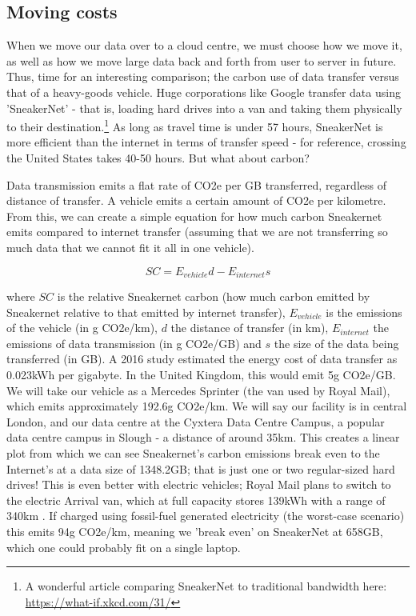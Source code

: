 \documentclass{article}
\begin{document}
\subsection{Moving costs}
When we move our data over to a cloud centre, we must choose how we move it, as well as how we move large data back and forth from user to server in future. Thus, time for an interesting comparison; the carbon use of data transfer versus that of a heavy-goods vehicle. Huge corporations like Google transfer data using 'SneakerNet' - that is, loading hard drives into a van and taking them physically to their destination.\footnote{A wonderful article comparing SneakerNet to traditional bandwidth here: \href{https://what-if.xkcd.com/31/}{https://what-if.xkcd.com/31/}} As long as travel time is under 57 hours, SneakerNet is more efficient than the internet in terms of transfer speed \citep{jaya2020sneakernet} - for reference, crossing the United States takes 40-50 hours. But what about carbon? \newline

Data transmission emits a flat rate of CO2e per GB transferred, regardless of distance of transfer. A vehicle emits a certain amount of CO2e per kilometre. From this, we can create a simple equation for how much carbon Sneakernet emits compared to internet transfer (assuming that we are not transferring so much data that we cannot fit it all in one vehicle).

$$SC = E_{vehicle}d - E_{internet}s$$

where $SC$ is the relative Sneakernet carbon (how much carbon emitted by Sneakernet relative to that emitted by internet transfer), $E_{vehicle}$ is the emissions of the vehicle (in g CO2e/km), $d$ the distance of transfer (in km), $E_{internet}$ the emissions of data transmission (in g CO2e/GB) and $s$ the size of the data being transferred (in GB). A 2016 study estimated the energy cost of data transfer as 0.023kWh per gigabyte. \citep{aslan2018electricity} In the United Kingdom, this would emit 5g CO2e/GB. We will take our vehicle as a Mercedes Sprinter (the van used by Royal Mail), which emits approximately 192.6g CO2e/km. \citep{mercedes2019sprinter} We will say our facility is in central London, and our data centre at the Cyxtera Data Centre Campus, a popular data centre campus in Slough - a distance of around 35km. This creates a linear plot from which we can see Sneakernet's carbon emissions break even to the Internet's at a data size of 1348.2GB; that is just one or two regular-sized hard drives! This is even better with electric vehicles; Royal Mail plans to switch to the electric Arrival van, which at full capacity stores 139kWh with a range of 340km \citep{hubbard2021new}. If charged using fossil-fuel generated electricity (the worst-case scenario) this emits 94g CO2e/km, meaning we 'break even' on SneakerNet at 658GB, which one could probably fit on a single laptop. \newline
\end{document}
